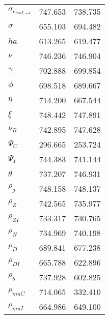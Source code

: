 \begin{center}
\begin{longtable}{lcc}
$ \sigma_{{e_{muI,-4}}}   $	 & 	     747.653	 & 	     738.735 \\ 
$ {\sigma}                $	 & 	     655.103	 & 	     694.482 \\ 
$ {ha}                    $	 & 	     613.265	 & 	     619.477 \\ 
$ \nu                     $	 & 	     746.236	 & 	     746.904 \\ 
$ \gamma                  $	 & 	     702.888	 & 	     699.854 \\ 
$ {\phi}                  $	 & 	     698.518	 & 	     689.667 \\ 
$ {\eta}                  $	 & 	     714.200	 & 	     667.544 \\ 
$ \xi                     $	 & 	     748.442	 & 	     747.891 \\ 
$ {\nu_R}                 $	 & 	     742.895	 & 	     747.628 \\ 
$ {\Psi_{C}}              $	 & 	     296.665	 & 	     253.724 \\ 
$ {\Psi_I}                $	 & 	     744.383	 & 	     741.144 \\ 
$ {\theta}                $	 & 	     737.207	 & 	     746.931 \\ 
$ {\rho_g}                $	 & 	     748.158	 & 	     748.137 \\ 
$ {\rho_Z}                $	 & 	     742.565	 & 	     735.977 \\ 
$ {\rho_{ZI}}             $	 & 	     733.317	 & 	     730.765 \\ 
$ {\rho_N}                $	 & 	     734.969	 & 	     740.198 \\ 
$ {\rho_D}                $	 & 	     689.841	 & 	     677.238 \\ 
$ {\rho_{DI}}             $	 & 	     665.788	 & 	     622.896 \\ 
$ {\rho_b}                $	 & 	     737.928	 & 	     602.825 \\ 
$ {\rho_{muC}}            $	 & 	     714.065	 & 	     332.410 \\ 
$ {\rho_{muI}}            $	 & 	     664.986	 & 	     649.100 \\ 
\end{longtable}
 \end{center}
